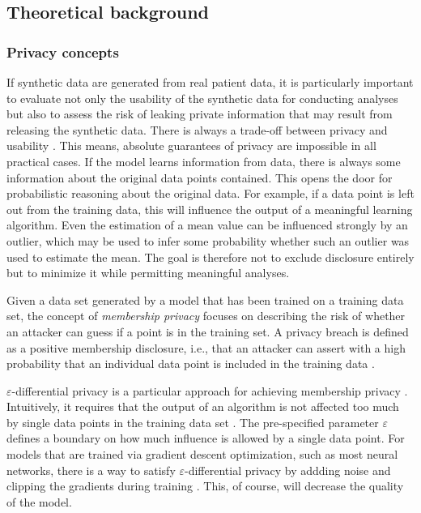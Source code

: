 \documentclass[12pt]{article}
\begin{document}
\subsection{Theoretical background}

\subsubsection{Privacy concepts}\label{privacyconcepts}
If synthetic data are generated from real patient data, it is particularly important to evaluate not only the usability of the synthetic data for conducting analyses but also to assess the risk of leaking private information that may result from releasing the synthetic data.
There is always a trade-off between privacy and usability \citep{dinur_revealing_2003, kifer_no_2011}.
This means, absolute guarantees of privacy are impossible in all practical cases.
If the model learns information from data, there is always some information about the original data points contained.
This opens the door for probabilistic reasoning about the original data.
For example, if a data point is left out from the training data, this will influence the output of a meaningful learning algorithm.
Even the estimation of a mean value can be influenced strongly by an outlier, which may be used to infer some probability whether such an outlier was used to estimate the mean.
The goal is therefore not to exclude disclosure entirely but to minimize it while permitting meaningful analyses.

Given a data set generated by a model that has been trained on a training data set, the concept of {\em membership privacy} \citep{li_membership_2013} focuses on describing the risk of whether an attacker can guess if a point is in the training set.
A privacy breach is defined as a positive membership disclosure, i.e., that an attacker can assert with a high probability that an individual data point is included in the training data \citep{li_membership_2013}.

$\varepsilon$-differential privacy is a particular approach for achieving membership privacy \citep{dwork_differential_2008}.
Intuitively, it requires that the output of an algorithm is not affected too much by single data points in the training data set \citep{li_membership_2013}.
The pre-specified parameter $\varepsilon$ defines a boundary on how much influence is allowed by a single data point.
For models that are trained via gradient descent optimization, such as most neural networks, there is a way to satisfy $\varepsilon$-differential privacy by addding noise and clipping the gradients during training \citep{abadi_deep_2016}.
This, of course, will decrease the quality of the model.
\end{document}
